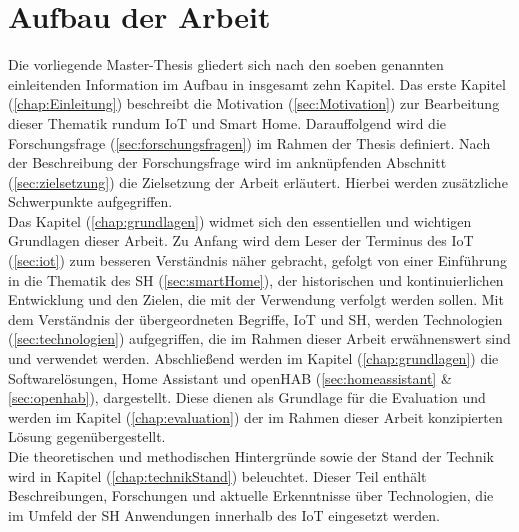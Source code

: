 \section{Aufbau der Arbeit}
\label{sec:aufbau}
    Die vorliegende Master-Thesis gliedert sich nach den soeben genannten einleitenden Information im Aufbau in insgesamt 
    zehn Kapitel. Das erste Kapitel (\ref{chap:Einleitung}) beschreibt die Motivation (\ref{sec:Motivation}) zur Bearbeitung 
    dieser Thematik rundum \acs{IoT} und Smart Home. Darauffolgend wird die 
    Forschungsfrage (\ref{sec:forschungsfragen}) im Rahmen der Thesis definiert. Nach der 
    Beschreibung der Forschungsfrage wird im anknüpfenden Abschnitt (\ref{sec:zielsetzung}) die Zielsetzung der 
    Arbeit erläutert. Hierbei werden zusätzliche Schwerpunkte aufgegriffen. 
    \\
    \linebreak
    Das Kapitel (\ref{chap:grundlagen}) widmet sich den essentiellen und wichtigen Grundlagen dieser Arbeit. Zu Anfang wird dem 
    Leser der Terminus des \acl{IoT} (\ref{sec:iot}) zum besseren Verständnis näher gebracht, 
    gefolgt von einer Einführung in die Thematik des \acl{SH} (\ref{sec:smartHome}), der 
    historischen und kontinuierlichen Entwicklung und den Zielen, die mit der Verwendung verfolgt 
    werden sollen. Mit dem Verständnis der übergeordneten Begriffe, \acs{IoT} und \acl{SH}, werden Technologien 
    (\ref{sec:technologien}) aufgegriffen, die im Rahmen dieser Arbeit erwähnenswert sind und verwendet werden. %
    Abschließend werden im Kapitel (\ref{chap:grundlagen}) die Softwarelösungen, Home Assistant 
    und openHAB (\ref{sec:homeassistant} \& \ref{sec:openhab}), dargestellt. Diese dienen als Grundlage für die Evaluation und werden im Kapitel 
    (\ref{chap:evaluation}) der im Rahmen dieser Arbeit konzipierten Lösung gegenübergestellt. 
    \\
    \linebreak
    Die theoretischen und methodischen Hintergründe sowie der Stand der Technik wird in Kapitel (\ref{chap:technikStand})
    beleuchtet. Dieser Teil enthält Beschreibungen, Forschungen und aktuelle Erkenntnisse über Technologien, die im Umfeld der 
    \acl{SH} Anwendungen innerhalb des \acs{IoT} eingesetzt werden. 
    \\
    \linebreak
